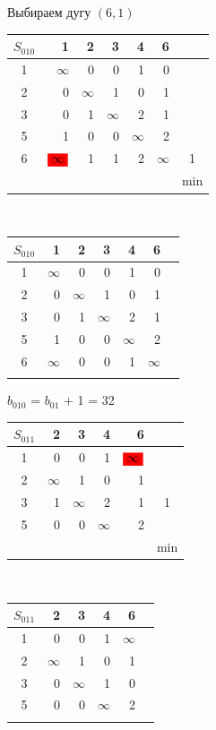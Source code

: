 \documentclass[12pt]{article}
\begin{document}
Выбираем дугу $(6,1)$

\begin{flushleft}
 \begin{tabular}{c||rrrrr||c}
$S_{010}$ & 1 &2 & 3 & 4 & 6 & \\
\hline
\hline
1 & $\infty$ & 0 & 0 & 1  & 0 & \\
2 & 0 & $\infty$ & 1 & 0  & 1 & \\
3 & 0 & 1 & $\infty$ & 2  & 1 & \\
5 & 1 & 0 & 0 & $\infty$  & 2 \\
6 & $\colorbox{red}{$\infty$}$ & 1 & 1 & 2 & $\infty$ & 1\\
\hline
\hline
 &  &   &  &  &  & min \\
\end{tabular}
$\qquad $ 
 \begin{tabular}{c||rrrrr||c}
$S_{010}$ & 1 &2 & 3 & 4 & 6 & \\
\hline
\hline
1 & $\infty$ & 0 & 0 & 1  & 0 & \\
2 & 0 & $\infty$ & 1 & 0  & 1 & \\
3 & 0 & 1 & $\infty$ & 2  & 1 & \\
5 & 1 & 0 & 0 & $\infty$  & 2 \\
6 & $\infty$ & 0 & 0 & 1 & $\infty$ & \\
\hline
\hline
 & &   &  &  &  & \\
\end{tabular}
\end{flushleft}

$b_{010}$ = $b_{01}$ + 1 = 32\\

\begin{flushleft}
\begin{tabular}{c||rrrr||c}
$S_{011}$  &2 & 3 & 4 & 6 & \\
\hline
\hline
1 &  0 & 0 & 1  & $\colorbox{red}{$\infty$}$ & \\
2 &  $\infty$ & 1 & 0  & 1 & \\
3 &  1 & $\infty$ & 2  & 1 & 1\\
5 &  0 & 0 & $\infty$  & 2 \\
\hline
\hline
 &  &  &  &  & min \\
\end{tabular}
$\qquad $ 
\begin{tabular}{c||rrrr||c}
$S_{011}$  &2 & 3 & 4 & 6 & \\
\hline
\hline
1 &  0 & 0 & 1  & $\infty$ & \\
2 &  $\infty$ & 1 & 0  & 1 & \\
3 &  0 & $\infty$ & 1  & 0 & \\
5 &  0 & 0 & $\infty$  & 2 \\
\hline
\hline
 &  &  &  & & \\
\end{tabular}
\end{flushleft}
\end{document}
